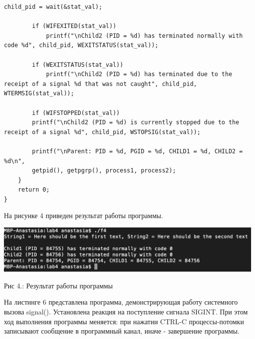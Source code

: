 \documentclass[12pt]{report}
\begin{document}
\begin{lstlisting}[label=some-code,caption=Задание 4]
        child_pid = wait(&stat_val);
        
        if (WIFEXITED(stat_val))
            printf("\nChild2 (PID = %d) has terminated normally with code %d", child_pid, WEXITSTATUS(stat_val));
        
        if (WEXITSTATUS(stat_val))
            printf("\nChild2 (PID = %d) has terminated due to the receipt of a signal %d that was not caught", child_pid, WTERMSIG(stat_val));
    
        if (WIFSTOPPED(stat_val))
        printf("\nChild2 (PID = %d) is currently stopped due to the receipt of a signal %d", child_pid, WSTOPSIG(stat_val));
         
        printf("\nParent: PID = %d, PGID = %d, CHILD1 = %d, CHILD2 = %d\n",
        getpid(), getpgrp(), process1, process2);
    }
    return 0;
}
\end{lstlisting}

На рисунке 4 приведен результат работы программы.
\begin{center}
		\includegraphics[scale=0.8]{pics/proc4.png}
		
			Рис 4.:  Результат работы программы
\end{center}

На листинге 6 представлена программа, демонстрирующая работу системного вызова signal(). Установлена реакция на поступление сигнала SIGINT. При этом ход выполнения программы меняется: при нажатии CTRL-C процессы-потомки записывают сообщение в программный канал, иначе - завершение программы.
\end{document}
